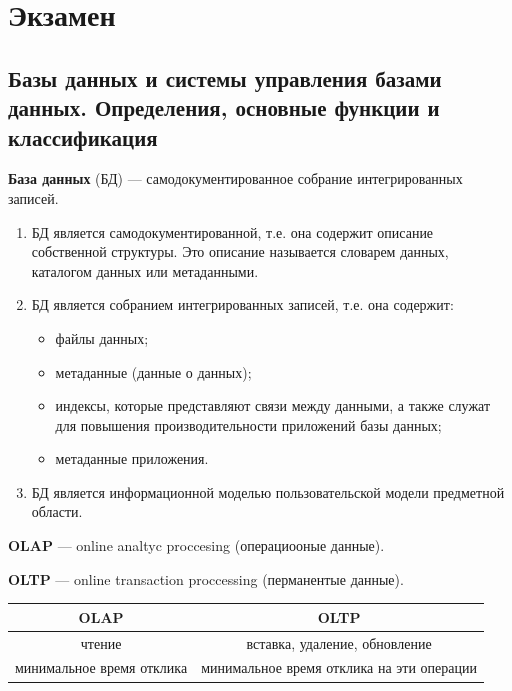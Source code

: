 \section{Экзамен}

\subsection{Базы данных и системы управления базами данных. Определения, основные функции и классификация}

\textbf{База данных} (БД) ---  самодокументированное собрание интегрированных записей.

\begin{enumerate}
	\item БД является самодокументированной, т.е. она содержит описание собственной структуры. Это описание называется словарем данных, каталогом данных или метаданными.
	\item БД является собранием интегрированных записей, т.е. она содержит:
	\begin{itemize}
		\item файлы данных;
		\item метаданные (данные о данных);
		\item индексы, которые представляют связи между данными, а также служат для повышения производительности приложений базы данных;
		\item метаданные приложения.
	\end{itemize}
	\item БД является информационной моделью пользовательской модели предметной области.
\end{enumerate}

\textbf{OLAP} --- online analtyc proccesing (операциооные данные).

\textbf{OLTP} --- online transaction proccessing (перманентые данные).

\begin{table}[ht!]
	\begin{center}

		\begin{tabular}{|c|c|}
			\hline
			OLAP & OLTP \\
			\hline
			чтение & вставка, удаление, обновление \\
			\hline
			минимальное время отклика & минимальное время отклика на эти операции \\
			\hline
		\end{tabular}
	\end{center}
\end{table}

